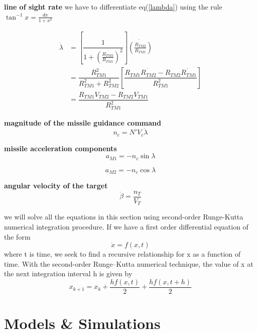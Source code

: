 \textbf{line of sight rate} we have to differentiate eq(\ref{lambda}) using the rule $\tan^{-1}x = \frac{dx}{1+x^2}$ 

\begin{equation}
	\begin{split}
	\dot{\lambda} &= [\dfrac{1}{1+(\frac{R_{TM2}}{R_{TM1}})^2}] \dot{(\frac{R_{TM2}}{R_{TM1}})}\\
	&= \dfrac{R_{TM1}^2}{R_{TM1}^2 + R_{TM2}^2}[\dfrac{R_{TM1}\dot{R_{TM2}}- R_{TM2} \dot{R_{TM1}}}{R_{TM1}^2}]\\
	&=\dfrac{R_{TM1} V_{TM2} - R_{TM2} V_{TM1}}{R_{TM1}^2}
	\end{split}
\end{equation}

\textbf{magnitude of the missile guidance command}
\begin{equation}
		n_c= N' V_c \dot{\lambda}
\end{equation}

\textbf{missile acceleration components}
\begin{equation}
	a_{M1} = - n_c \sin \lambda
\end{equation}

\begin{equation}
a_{M2} = - n_c \cos \lambda
\end{equation}

\textbf{angular velocity of the target}
\begin{equation}
	\dot{\beta} = \dfrac{n_T}{V_T}
\end{equation}

we will solve all the equations in this section using second-order Runge-Kutta numerical integration procedure. If we have a first order differential equation of the form 
\begin{equation*}
	\dot{x} = f(x,t) 
\end{equation*} 
 where t is time, we seek to find a recursive relationship for x as a function of time.
 With the second-order Runge–Kutta numerical technique, the value of x at the
 next integration interval h is given by
 \begin{equation*}
 	x_{k+1} = x_k + \dfrac{hf(x,t)}{2} + \dfrac{h f(x, t+h)}{2}
 \end{equation*}
\section{Models \& Simulations}

